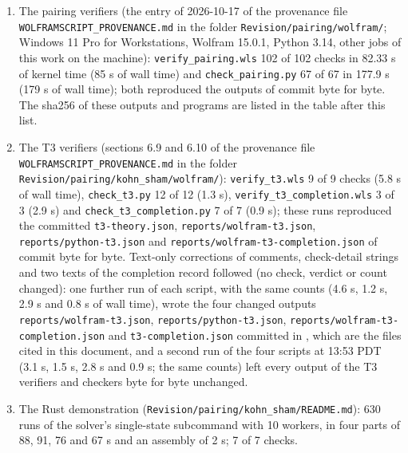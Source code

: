 \documentclass[11pt]{article}
\begin{document}
\begin{enumerate}
\item The pairing verifiers (the entry of 2026-10-17 of the provenance file \texttt{WOLFRAMS\allowbreak{}CRIPT\_PR\allowbreak{}OVENANCE\allowbreak{}.md} in the folder \texttt{Revision\allowbreak{}/pairing\allowbreak{}/wolfram\allowbreak{}/}; Windows 11 Pro for Workstations, Wolfram 15.0.1, Python 3.14, other jobs of this work on the machine): \texttt{verify\_p\allowbreak{}airing.w\allowbreak{}ls} 102 of 102 checks in 82.33 s of kernel time (85 s of wall time) and \texttt{check\_pa\allowbreak{}iring.py} 67 of 67 in 177.9 s (179 s of wall time); both reproduced the outputs of commit \texttt{} byte for byte. The sha256 of these outputs and programs are listed in the table after this list.
\item The T3 verifiers (sections 6.9 and 6.10 of the provenance file \texttt{WOLFRAMS\allowbreak{}CRIPT\_PR\allowbreak{}OVENANCE\allowbreak{}.md} in the folder \texttt{Revision\allowbreak{}/pairing\allowbreak{}/kohn\_sh\allowbreak{}am/wolfr\allowbreak{}am/}): \texttt{verify\_t\allowbreak{}3.wls} 9 of 9 checks (5.8 s of wall time), \texttt{check\_t3\allowbreak{}.py} 12 of 12 (1.3 s), \texttt{verify\_t\allowbreak{}3\_comple\allowbreak{}tion.wls} 3 of 3 (2.9 s) and \texttt{check\_t3\allowbreak{}\_complet\allowbreak{}ion.py} 7 of 7 (0.9 s); these runs reproduced the committed \texttt{t3-theor\allowbreak{}y.json}, \texttt{reports/\allowbreak{}wolfram-\allowbreak{}t3.json}, \texttt{reports/\allowbreak{}python-t\allowbreak{}3.json} and \texttt{reports/\allowbreak{}wolfram-\allowbreak{}t3-compl\allowbreak{}etion.js\allowbreak{}on} of commit \texttt{} byte for byte. Text-only corrections of comments, check-detail strings and two texts of the completion record followed (no check, verdict or count changed): one further run of each script, with the same counts (4.6 s, 1.2 s, 2.9 s and 0.8 s of wall time), wrote the four changed outputs \texttt{reports/\allowbreak{}wolfram-\allowbreak{}t3.json}, \texttt{reports/\allowbreak{}python-t\allowbreak{}3.json}, \texttt{reports/\allowbreak{}wolfram-\allowbreak{}t3-compl\allowbreak{}etion.js\allowbreak{}on} and \texttt{t3-compl\allowbreak{}etion.js\allowbreak{}on} committed in \texttt{}, which are the files cited in this document, and a second run of the four scripts at 13:53 PDT (3.1 s, 1.5 s, 2.8 s and 0.9 s; the same counts) left every output of the T3 verifiers and checkers byte for byte unchanged.
\item The Rust demonstration (\texttt{Revision\allowbreak{}/pairing\allowbreak{}/kohn\_sh\allowbreak{}am/READM\allowbreak{}E.md}): 630 runs of the solver's single-state subcommand with 10 workers, in four parts of 88, 91, 76 and 67 s and an assembly of 2 s; 7 of 7 checks.

\end{enumerate}
\end{document}
